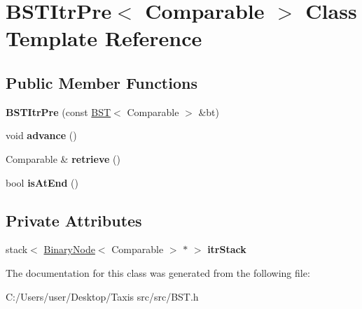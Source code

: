 \hypertarget{class_b_s_t_itr_pre}{}\section{B\+S\+T\+Itr\+Pre$<$ Comparable $>$ Class Template Reference}
\label{class_b_s_t_itr_pre}
\subsection*{Public Member Functions}
\begin{DoxyCompactItemize}
\item 
\mbox{\label{class_b_s_t_itr_pre_a11b1cd4e783f153b9c1b64ce2ec8077e}} 
{\bfseries B\+S\+T\+Itr\+Pre} (const \hyperlink{class_b_s_t}{B\+ST}$<$ Comparable $>$ \&bt)
\item 
\mbox{\label{class_b_s_t_itr_pre_a7a743d66a842018fd833fb2b0737254d}} 
void {\bfseries advance} ()
\item 
\mbox{\label{class_b_s_t_itr_pre_af40033e97f63bf025c2e33a9fdce4c43}} 
Comparable \& {\bfseries retrieve} ()
\item 
\mbox{\label{class_b_s_t_itr_pre_ae282a7b9ffa9d250bb0f6a6d79f6e8d0}} 
bool {\bfseries is\+At\+End} ()
\end{DoxyCompactItemize}
\subsection*{Private Attributes}
\begin{DoxyCompactItemize}
\item 
\mbox{\label{class_b_s_t_itr_pre_a73e938d809acba06490472e7fc1bd6d3}} 
stack$<$ \hyperlink{class_binary_node}{Binary\+Node}$<$ Comparable $>$ $\ast$ $>$ {\bfseries itr\+Stack}
\end{DoxyCompactItemize}


The documentation for this class was generated from the following file\+:\begin{DoxyCompactItemize}
\item 
C\+:/\+Users/user/\+Desktop/\+Taxis src/src/B\+S\+T.\+h\end{DoxyCompactItemize}
